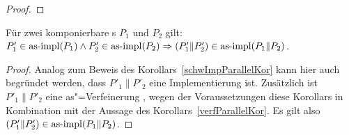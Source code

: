 \begin{proof}
\end{proof}

\begin{Kor}
  Für zwei komponierbare \MEIO{}s $P_1$ und $P_2$ gilt:
  $P'_1\in\mathrm{as}\text{-}\mathrm{impl} (P_1) \land P'_2 \in\mathrm{as}\text{-}\mathrm{impl} (P_2) \Rightarrow (P'_1\|P'_2)
  \in\mathrm{as}\text{-}\mathrm{impl} (P_1\|P_2)$.
\end{Kor}
\begin{proof}
  Analog zum Beweis des Korollars~\ref{schwImpParallelKor} kann hier auch
  begründet werden, dass $P'_1\|P'_2$ eine Implementierung ist. Zusätzlich
  ist $P'_1\|P'_2$ eine as"=Verfeinerung , wegen der Voraussetzungen diese
  Korollars in Kombination mit der Aussage des Korollars~\ref{verfParallelKor}.
  Es gilt also $(P'_1\|P'_2)\in\mathrm{as}\text{-}\mathrm{impl} (P_1\|P_2)$.
\end{proof}

